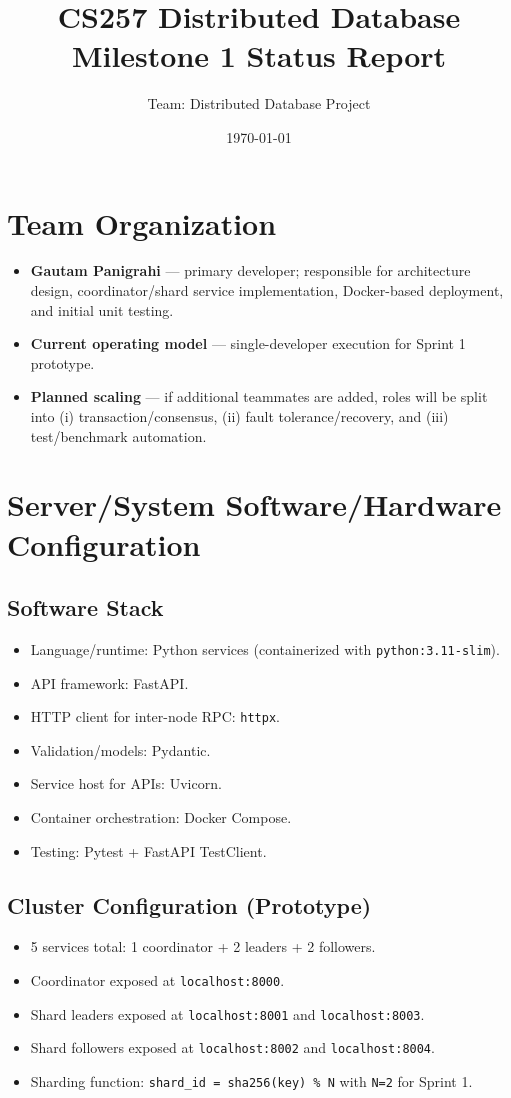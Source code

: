 \documentclass[11pt]{article}
\title{CS257 Distributed Database\\Milestone 1 Status Report}
\author{Team: Distributed Database Project}
\date{\today}
\begin{document}
\maketitle

\section{Team Organization}
\begin{itemize}[leftmargin=1.2em]
    \item \textbf{Gautam Panigrahi} --- primary developer; responsible for architecture design, coordinator/shard service implementation, Docker-based deployment, and initial unit testing.
    \item \textbf{Current operating model} --- single-developer execution for Sprint 1 prototype.
    \item \textbf{Planned scaling} --- if additional teammates are added, roles will be split into (i) transaction/consensus, (ii) fault tolerance/recovery, and (iii) test/benchmark automation.
\end{itemize}

\section{Server/System Software/Hardware Configuration}
\subsection*{Software Stack}
\begin{itemize}[leftmargin=1.2em]
    \item Language/runtime: Python services (containerized with \texttt{python:3.11-slim}).
    \item API framework: FastAPI.
    \item HTTP client for inter-node RPC: \texttt{httpx}.
    \item Validation/models: Pydantic.
    \item Service host for APIs: Uvicorn.
    \item Container orchestration: Docker Compose.
    \item Testing: Pytest + FastAPI TestClient.
\end{itemize}

\subsection*{Cluster Configuration (Prototype)}
\begin{itemize}[leftmargin=1.2em]
    \item 5 services total: 1 coordinator + 2 leaders + 2 followers.
    \item Coordinator exposed at \texttt{localhost:8000}.
    \item Shard leaders exposed at \texttt{localhost:8001} and \texttt{localhost:8003}.
    \item Shard followers exposed at \texttt{localhost:8002} and \texttt{localhost:8004}.
    \item Sharding function: \texttt{shard\_id = sha256(key) \% N} with \texttt{N=2} for Sprint 1.
\end{itemize}
\end{document}
